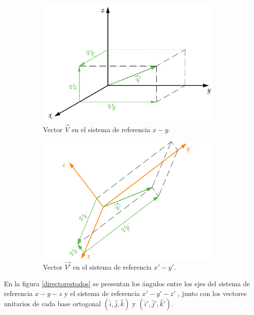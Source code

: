 \documentclass[12pt,letterpaper]{article}
\begin{document}
\begin{figure}[H]
\begin{subfigure}[l]{0.450\textwidth}
		\includegraphics[width=\textwidth]{img/Vector1Componentes3D.pdf}
		\caption{Vector $\overset{\rightarrow}{V}$ en el sistema de referencia $x-y$.}
		\label{vector1comp3d}
	\end{subfigure}
	\hspace{.5 cm}
	\begin{subfigure}[r]{0.450\textwidth}
		\includegraphics[width=\textwidth]{img/Vector2Componentes3D.pdf}
		\caption{Vector $\overset{\rightarrow}{V'}$ en el sistema de referencia $x'-y'$.}
		\label{vector2comp3d}
	\end{subfigure}	
	\caption{}
	\label{directores}
\end{figure}
%
%
%
%
%
En la figura \ref{directorestodos} se presentan los ángulos entre los ejes del sistema de referencia $x-y-z$ y el sistema de referencia $x'-y'-z'$ , junto con los vectores unitarios de cada base ortogonal $\left( \hat{i}, \hat{j}, \hat{k} \right)$ y $\left( \hat{i}', \hat{j}', \hat{k}' \right)$.\\\\
\end{document}
